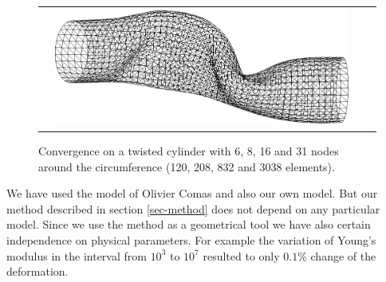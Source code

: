 \begin{figure}[tbh]
\begin{tabular}{cccc}
    &
    \includegraphics[width=0.24\columnwidth]{img/twist-31w-cg.png}
  \end{tabular}
  \caption{Convergence on a twisted cylinder with 6, 8, 16 and 31 nodes
  around the circumference (120, 208, 832 and 3038 elements).
   } 
  \label{fig-convergence}
\end{figure}

We have used the model of Olivier Comas \cite{Comas2010b,Comas2010c} and
also our own model. But our method described in section \ref{sec-method}
does not depend on any particular model. Since we use the method as a
geometrical tool we have also certain independence on physical parameters.
For example the variation of Young's modulus in the interval from $10^3$ to
$10^7$ resulted to only $0.1\%$ change of the deformation.


